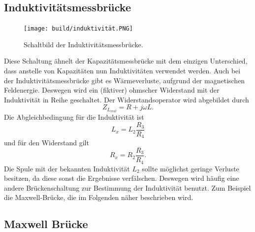 \subsection{Induktivitätsmessbrücke}
\label{subsec:induktivität}

\begin{figure}[H]
    \centering
    \texttt{[image: build/induktivität.PNG]}
    \caption{Schaltbild der Induktivitätsmessbrücke.\cite[221]{V302}}
    \label{fig:induktivität}
\end{figure}
Diese Schaltung ähnelt der Kapazitätsmessbrücke mit dem einzigen Unterschied, dass anstelle von Kapazitäten nun Induktivitäten verwendet werden.
Auch bei der Induktivitätsmessbrücke gibt es Wärmeverluste, aufgrund der magnetischen Feldenergie.
Deswegen wird ein (fiktiver) ohmscher Widerstand mit der Induktivität in Reihe geschaltet.
Der Widerstandsoperator wird abgebildet durch
\begin{equation}
    Z_{L_{real}} = R + j\omega L.
    \label{eqn:widerop_ind}
\end{equation}
Die Abgleichbedingung für die Induktivität ist
\begin{equation}
    L_x = L_2 \frac{R_3}{R_4}
    \label{eqn:induktivität_ind}
\end{equation}
und für den Widerstand gilt
\begin{equation}
    R_x = R_2 \frac{R_3}{R_4}.
    \label{eqn:widerstand_ind}
\end{equation}
Die Spule mit der bekannten Induktivität $L_2$ sollte möglichst geringe Verluste besitzen, da diese sonst die Ergebnisse verfälschen. 
Deswegen wird häufig eine andere Brückenschaltung zur Bestimmung der Induktivität benutzt.
Zum Beispiel die Maxwell-Brücke, die im Folgenden näher beschrieben wird.

\subsection{Maxwell Brücke}
\label{subsec:maxwell}

